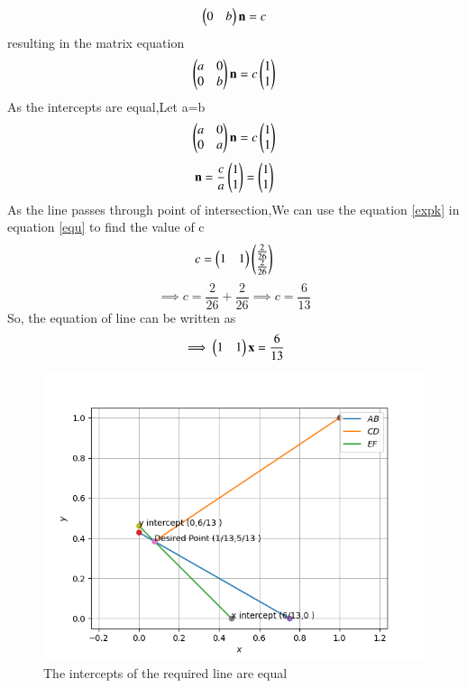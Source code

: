 \documentclass[journal,12pt,twocolumn]{IEEEtran}
\begin{document}
\begin{flushleft}
    \begin{align} 
    \begin{pmatrix}0 & b\end{pmatrix}\mathbf{n} = c
    \end{align}
    resulting in the matrix equation
    \begin{equation}
    \begin{pmatrix}a & 0 \\ 0 & b\end{pmatrix}\mathbf{n} = c \begin{pmatrix}1 \\ 1\end{pmatrix}
    \end{equation}
    As the intercepts are equal,Let a=b
    \begin{equation}
    \begin{pmatrix}a & 0 \\ 0 & a\end{pmatrix}\mathbf{n} = c \begin{pmatrix}1 \\ 1\end{pmatrix}
    \end{equation}
    \begin{equation}
    \mathbf{n} = \frac{c}{a}\begin{pmatrix}1\\1\end{pmatrix} = \begin{pmatrix}1\\1\end{pmatrix}
    \end{equation}
    As the line passes through point of intersection,We can use the equation \eqref{expk} in equation \eqref{equ} to find the value of c\\
    \begin{equation}
    c=
    \begin{pmatrix}1 & 1\end{pmatrix}
    \begin{pmatrix}
    	\frac{2}{26} \\
    	\frac{2}{26}
    \end{pmatrix}
    \end{equation}
    \begin{equation}
    \implies c=\frac{2}{26}+\frac{2}{26}
    \implies c=\frac{6}{13}
    \end{equation}
    So, the equation of line can be written as
    \begin{equation}
    \implies
    \begin{pmatrix}1 & 1\end{pmatrix}
    	{\mathbf{x}} = \frac{6}{13}
    \end{equation}
    \begin{figure}[!ht]
    \centering
    \includegraphics[width=\columnwidth]{Assignment_1}
     \caption{The intercepts of the required line are equal}
    \end{figure}
    \end{flushleft}
    
\end{document}
